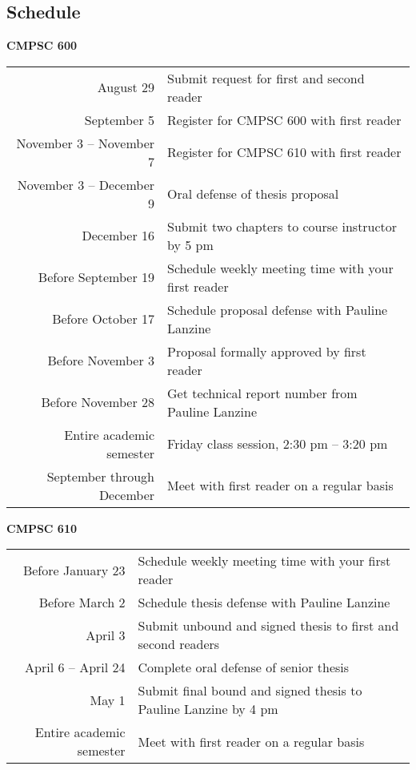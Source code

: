 \vspace*{-.25in}
\subsection*{Schedule}

{\bf CMPSC 600}
\begin{center}
\begin{tabular}{r|l}
\hline
August 29 & Submit request for first and second reader \\ 
September 5 & Register for CMPSC 600 with first reader \\ 
November 3 -- November 7 & Register for CMPSC 610 with first reader \\
November 3 -- December 9 & Oral defense of thesis proposal \\
December 16 & Submit two chapters to course instructor by 5 pm\\
\hline
Before September 19 & Schedule weekly meeting time with your first reader \\
Before October 17 & Schedule proposal defense with Pauline Lanzine \\
Before November 3 & Proposal formally approved by first reader \\
Before November 28 & Get technical report number from Pauline Lanzine \\
\hline
Entire academic semester & Friday class session, 2:30 pm -- 3:20 pm \\
September through December & Meet with first reader on a regular basis \\
\hline
\end{tabular}
\end{center}


\noindent
{\bf CMPSC 610}
\begin{center}
\begin{tabular}{r|l}
\hline
Before January 23 & Schedule weekly meeting time with your first reader \\ 
Before March 2 & Schedule thesis defense with Pauline Lanzine \\
April 3 & Submit unbound and signed thesis to first and second readers \\
April 6 -- April 24 & Complete oral defense of senior thesis \\
May 1 & Submit final bound and signed thesis to Pauline Lanzine by 4 pm\\
\hline
Entire academic semester & Meet with first reader on a regular basis \\ 
\hline
\end{tabular}
\end{center}

